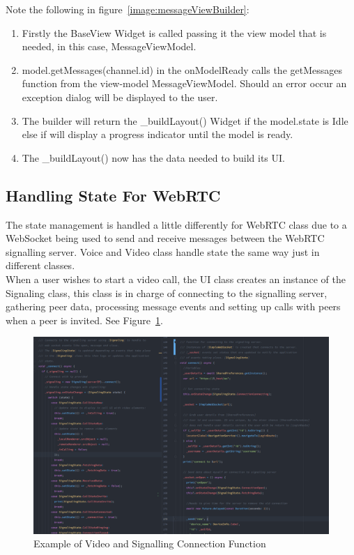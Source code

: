 Note the following in figure~\ref{image:messageViewBuilder}:
\begin{enumerate}
	\item Firstly the BaseView Widget is called passing it the view model that is needed, in this case, MessageViewModel.
	\item model.getMessages(channel.id) in the onModelReady calls the getMessages function from the view-model MessageViewModel. Should an error occur an exception dialog will be displayed to the user.
	\item The builder will return the \_buildLayout() Widget if the model.state is Idle else if will display a progress indicator until the model is ready.
	\item The \_buildLayout() now has the data needed to build its UI.
\end{enumerate}

\subsection{Handling State For WebRTC}
The state management is handled a little differently for WebRTC class due to a WebSocket being used to send and receive messages between the WebRTC signalling server. Voice and Video class handle state the same way just in different classes.
\\ When a user wishes to start a video call, the UI class creates an instance of the Signaling class, this class is in charge of connecting to the signalling server, gathering peer data, processing message events and setting up calls with peers when a peer is invited. See Figure~\ref{image:videoSignallingConnectFunc}.
\begin{figure}[h!]
    \caption{Example of Video and Signalling Connection Function}
    \label{image:videoSignallingConnectFunc}
    \centering
    \includegraphics[width=1.0\textwidth]{images/video_and_signalling_connect_fcuntions.png}
\end{figure}

